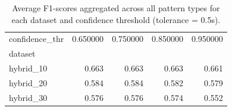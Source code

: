 \begin{table}[H]
\centering
\begin{table}
\caption{Average F1-scores aggregated across all pattern types for each dataset and confidence threshold (tolerance = 0.5s).}
\label{tab:f1_confidence_dataset_summary_t5}
\begin{tabular}{lrrrr}
\toprule
confidence_thr & 0.650000 & 0.750000 & 0.850000 & 0.950000 \\
dataset &  &  &  &  \\
\midrule
hybrid_10 & 0.663 & 0.663 & 0.663 & 0.661 \\
hybrid_20 & 0.584 & 0.584 & 0.582 & 0.579 \\
hybrid_30 & 0.576 & 0.576 & 0.574 & 0.552 \\
\bottomrule
\end{tabular}
\end{table}
\end{table}
